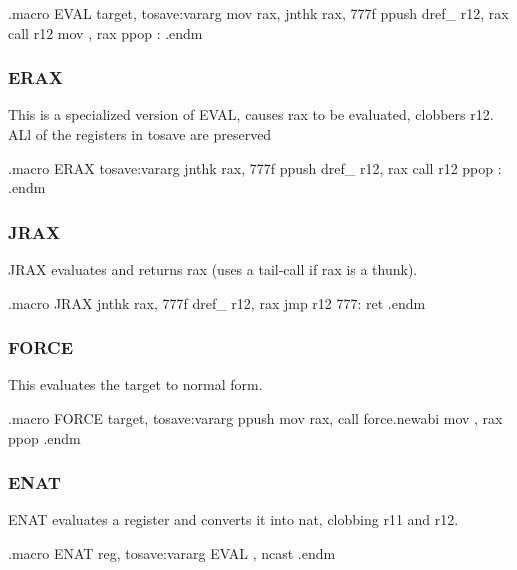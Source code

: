 \begin{asm}
.macro EVAL target, tosave:vararg
	mov	rax, \target
	jnthk	rax, 777f
	ppush	\tosave
	dref_	r12, rax
	call	r12
	mov	\target, rax
	ppop	:
.endm
\end{asm}

\subsubsection{ERAX}

This is a specialized version of EVAL, causes rax to be evaluated,
clobbers r12.  ALl of the registers in tosave are preserved

\begin{asm}
.macro ERAX tosave:vararg
	jnthk	rax, 777f
	ppush	\tosave
	dref_	r12, rax
	call	r12
	ppop	:
.endm
\end{asm}

\subsubsection{JRAX}

JRAX evaluates and returns rax (uses a tail-call if rax is a thunk).

\begin{asm}
.macro JRAX
	jnthk	rax, 777f
	dref_	r12, rax
	jmp	r12
777:
	ret
.endm
\end{asm}

\subsubsection{FORCE}

This evaluates the target to normal form.

\begin{asm}
.macro FORCE target, tosave:vararg
	ppush	\tosave
	mov	rax, \target
	call	force.newabi
	mov	\target, rax
	ppop	\tosave
.endm
\end{asm}

\subsubsection{ENAT}

ENAT evaluates a register and converts it into nat, clobbing r11
and r12.

\begin{asm}
.macro ENAT reg, tosave:vararg
	EVAL	\reg, \tosave
	ncast	\reg
.endm
\end{asm}



